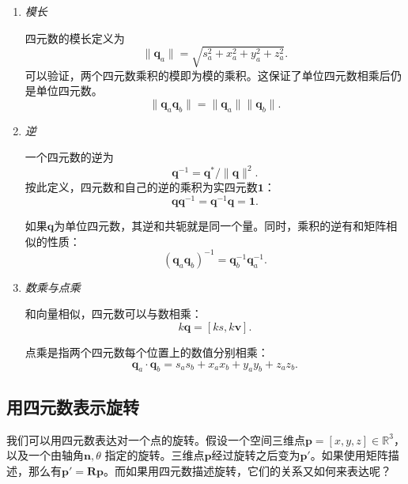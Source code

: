 \begin{enumerate}
	\item { \emph{模长} }
	
	四元数的模长定义为
	\begin{equation}
	\| \bm{q}_a \| = \sqrt{ s_a^2 + x_a^2 + y_a^2 + z_a^2 }.
	\end{equation}
	可以验证，两个四元数乘积的模即为模的乘积。这保证了单位四元数相乘后仍是单位四元数。
	\begin{equation}
	\| \bm{q}_a \bm{q}_b \| = \|\bm{q}_a \| \| \bm{q}_b \|.
	\end{equation}
	
	\item{ \emph{逆} }
	
	一个四元数的逆为
	\begin{equation}
	\label{eq:quaternionInverse}
	\bm{q}^{-1} = \bm{q}^* / \| \bm{q} \| ^2.
	\end{equation}
	按此定义，四元数和自己的逆的乘积为实四元数$\bm{1}$：
	\begin{equation}
	\bm{q} \bm{q}^{-1} = \bm{q}^{-1} \bm{q} = \bm{1}.
	\end{equation}
	
	如果$\bm{q}$为单位四元数，其逆和共轭就是同一个量。同时，乘积的逆有和矩阵相似的性质：
	\begin{equation}
	\left( \bm{q}_a \bm{q}_b \right)^{-1} = \bm{q}_b^{-1} \bm{q}_a^{-1}.
	\end{equation}
	
	\item{ \emph{数乘与点乘} }
	
	和向量相似，四元数可以与数相乘：
	\begin{equation}
	k \bm{q} = \left[ ks, k\bm{v} \right].
	\end{equation}
	
	点乘是指两个四元数每个位置上的数值分别相乘：
	\begin{equation}
	\bm{q}_a \cdot \bm{q}_b = s_a s_b + x_a x_b + y_a y_b + z_a z_b.
	\end{equation} 
\end{enumerate}

\subsection{用四元数表示旋转}
我们可以用四元数表达对一个点的旋转。假设一个空间三维点$\bm{p} = [x,y,z]\in \mathbb{R}^3$，以及一个由轴角$\bm{n}, \theta$ 指定的旋转。三维点$\bm{p}$经过旋转之后变为$\bm{p}'$。如果使用矩阵描述，那么有$\bm{p}'=\bm{R} \bm{p}$。而如果用四元数描述旋转，它们的关系又如何来表达呢？

